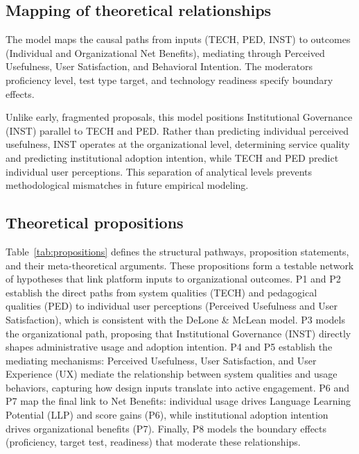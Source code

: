 \documentclass[11pt,a4paper]{article}
\begin{document}
\subsection{Mapping of theoretical relationships}

The model maps the causal paths from inputs (TECH, PED, INST) to outcomes (Individual and Organizational Net Benefits), mediating through Perceived Usefulness, User Satisfaction, and Behavioral Intention. The moderators proficiency level, test type target, and technology readiness specify boundary effects.

Unlike early, fragmented proposals, this model positions Institutional Governance (INST) parallel to TECH and PED. Rather than predicting individual perceived usefulness, INST operates at the organizational level, determining service quality and predicting institutional adoption intention, while TECH and PED predict individual user perceptions. This separation of analytical levels prevents methodological mismatches in future empirical modeling.

\subsection{Theoretical propositions}

Table~\ref{tab:propositions} defines the structural pathways, proposition statements, and their meta-theoretical arguments. These propositions form a testable network of hypotheses that link platform inputs to organizational outcomes. P1 and P2 establish the direct paths from system qualities (TECH) and pedagogical qualities (PED) to individual user perceptions (Perceived Usefulness and User Satisfaction), which is consistent with the DeLone \& McLean model. P3 models the organizational path, proposing that Institutional Governance (INST) directly shapes administrative usage and adoption intention. P4 and P5 establish the mediating mechanisms: Perceived Usefulness, User Satisfaction, and User Experience (UX) mediate the relationship between system qualities and usage behaviors, capturing how design inputs translate into active engagement. P6 and P7 map the final link to Net Benefits: individual usage drives Language Learning Potential (LLP) and score gains (P6), while institutional adoption intention drives organizational benefits (P7). Finally, P8 models the boundary effects (proficiency, target test, readiness) that moderate these relationships.
\end{document}
